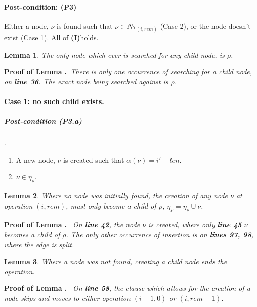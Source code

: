 \documentclass{article}
\newtheorem{lemma}{Lemma}[section]
\newenvironment{proof}{\par\noindent\textbf{Proof of Lemma \thelemma.}\ \itshape}{\par}
\begin{document}
	\paragraph{Post-condition: (P3)} Either a node, $\nu$ is found such that $\nu \in N\tau_{(i, rem)}$ (Case 2), or the node doesn't exist (Case 1). All of \textbf{(I)}holds.
	
	\begin{lemma}The only node which ever is searched for any child node, is $\rho$.\end{lemma}
	
	\begin{proof}There is only one occurrence of searching for a child node, on \textbf{line 36}.  The exact node being searched against is $\rho$.\end{proof}
	
	\paragraph{Case 1: no such child exists.}
	\subparagraph{Post-condition (P3.a)} .  
	\begin{enumerate}[label=(P3.a.\arabic*), ref=(P3.a.\arabic*)]
		\item A new node, $\nu$ is created such that $\alpha(\nu) = i\prime - len$.
		\item $\nu \in \eta_{\rho}$.
	\end{enumerate}

	\begin{lemma} Where no node was initially found, the creation of any node $\nu$ at operation $(i, rem)$, must only become a child of $\rho$, $\eta_{\rho} = \eta_{\rho}  \cup \nu$.\end{lemma}
	
	\begin{proof} On \textbf{line 42}, the node $\nu$ is created, where only \textbf{line 45} $\nu$ becomes a child of $\rho$.   The only other occurrence of insertion is on \textbf{lines 97, 98}, where the edge is split.\end{proof}
	
	\begin{lemma}
		Where a node was not found, creating a child node ends the operation.
	\end{lemma}
	\begin{proof}
		On \textbf{line 58}, the clause which allows for the creation of a node skips and moves to either operation $(i + 1, 0)$ or $(i, rem - 1)$.
	\end{proof}
	
\end{document}
